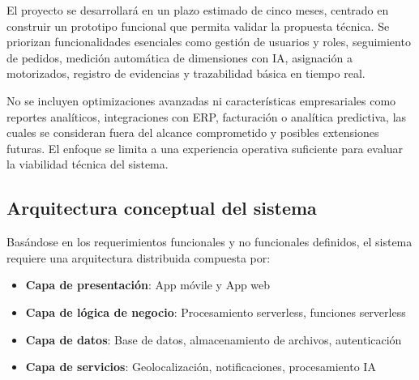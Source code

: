El proyecto se desarrollará en un plazo estimado de cinco meses, centrado en construir un prototipo funcional que permita validar la propuesta técnica. Se priorizan funcionalidades esenciales como gestión de usuarios y roles, seguimiento de pedidos, medición automática de dimensiones con IA, asignación a motorizados, registro de evidencias y trazabilidad básica en tiempo real.

No se incluyen optimizaciones avanzadas ni características empresariales como reportes analíticos, integraciones con ERP, facturación o analítica predictiva, las cuales se consideran fuera del alcance comprometido y posibles extensiones futuras. El enfoque se limita a una experiencia operativa suficiente para evaluar la viabilidad técnica del sistema.

\subsection{Arquitectura conceptual del sistema}

Basándose en los requerimientos funcionales y no funcionales definidos, el sistema requiere una arquitectura distribuida compuesta por:

\begin{itemize}
    \item \textbf{Capa de presentación}: App móvile y App web
    \item \textbf{Capa de lógica de negocio}: Procesamiento serverless, funciones serverless
    \item \textbf{Capa de datos}: Base de datos, almacenamiento de archivos, autenticación
    \item \textbf{Capa de servicios}: Geolocalización, notificaciones, procesamiento IA
\end{itemize}

